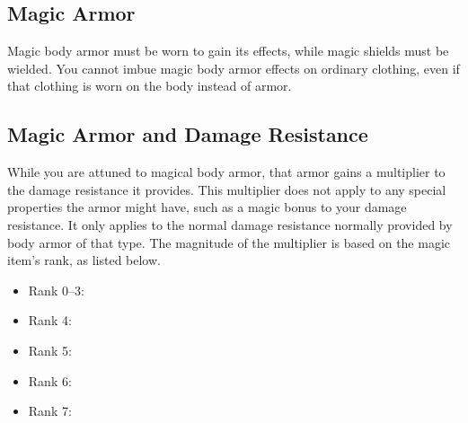 \begin{longcolumn}
\section{Magic Armor}
\begin{longtablepreface}
    Magic body armor must be worn to gain its effects, while magic shields must be wielded.
    You cannot imbue magic body armor effects on ordinary clothing, even if that clothing is worn on the body instead of armor.

    \subsection{Magic Armor and Damage Resistance}
        While you are attuned to magical body armor, that armor gains a multiplier to the damage resistance it provides.
        This multiplier does not apply to any special properties the armor might have, such as a magic bonus to your damage resistance.
        It only applies to the normal damage resistance normally provided by body armor of that type.
        The magnitude of the multiplier is based on the magic item's rank, as listed below.

        \begin{itemize}
            \item Rank 0--3: 
            \item Rank 4: 
            \item Rank 5: 
            \item Rank 6: 
            \item Rank 7: 
        \end{itemize}
\end{longtablepreface}

    

\end{longcolumn}

    


